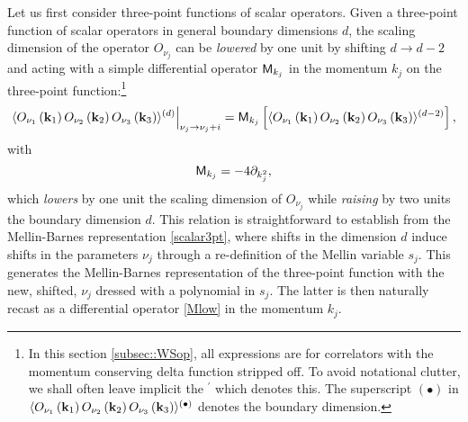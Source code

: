 \documentclass[11pt,a4paper]{article}
\begin{document}
Let us first consider three-point functions of scalar operators. Given a three-point function of scalar operators in general boundary dimensions $d$, the scaling dimension of the operator $O_{\nu_j}$ can be \emph{lowered} by one unit by shifting $d \to d-2$ and acting with a simple differential operator ${\sf M}_{k_j}$ in the momentum $k_j$ on the three-point function:\footnote{In this section \ref{subsec::WSop}, all expressions are for correlators with the momentum conserving delta function stripped off. To avoid notational clutter, we shall often leave implicit the ${}^\prime$ which denotes this. The superscript $(\bullet)$ in $\langle O_{\nu_1}\left({\bf k}_1\right)O_{\nu_2}\left({\bf k}_2\right)O_{\nu_3}\left({\bf k}_3\right)  \rangle{}^{(\bullet)}$ denotes the boundary dimension.}
\begin{equation}\label{Mlowcor}
   \langle O_{\nu_1}\left({\bf k}_1\right)O_{\nu_2}\left({\bf k}_2\right)O_{\nu_3}\left({\bf k}_3\right)  \rangle{}^{(d)}\Big|_{\nu_j \to \nu_j+i} =  {\sf M}_{k_j}\left[\langle O_{\nu_1}\left({\bf k}_1\right)O_{\nu_2}\left({\bf k}_2\right)O_{\nu_3}\left({\bf k}_3\right)  \rangle{}^{(d-2)} \right],
\end{equation}
with 
\begin{equation}\label{Mlow}
    {\sf M}_{k_j} = -4 \partial_{k^2_j},
\end{equation}
which \emph{lowers} by one unit the scaling dimension of $O_{\nu_j}$ while \emph{raising} by two units the boundary dimension $d$. This relation is straightforward to establish from the Mellin-Barnes representation \eqref{scalar3pt}, where shifts in the dimension $d$ induce shifts in the parameters $\nu_j$ through a re-definition of the Mellin variable $s_j$. This generates the Mellin-Barnes representation of the three-point function with the new, shifted, $\nu_j$ dressed with a polynomial in $s_j$. The latter is then naturally recast as a differential operator \eqref{Mlow} in the momentum $k_j$. 
\end{document}
